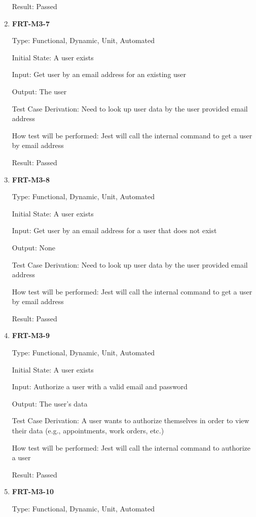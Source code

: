 \documentclass[12pt, titlepage]{article}
\begin{document}
\begin{enumerate}
	      Result: Passed

	\item \textbf{FRT-M3-7}

	      Type: Functional, Dynamic, Unit, Automated

	      Initial State: A user exists

	      Input: Get user by an email address for an existing user

	      Output: The user

	      Test Case Derivation: Need to look up user data by the user provided email address

	      How test will be performed: Jest will call the internal command to get a user by email address

	      Result: Passed

	\item \textbf{FRT-M3-8}

	      Type: Functional, Dynamic, Unit, Automated

	      Initial State: A user exists

	      Input: Get user by an email address for a user that does not exist

	      Output: None

	      Test Case Derivation: Need to look up user data by the user provided email address

	      How test will be performed: Jest will call the internal command to get a user by email address

	      Result: Passed

	\item \textbf{FRT-M3-9}

	      Type: Functional, Dynamic, Unit, Automated

	      Initial State: A user exists

	      Input: Authorize a user with a valid email and password

	      Output: The user's data

	      Test Case Derivation: A user wants to authorize themselves in order to view their data (e.g.,
	      appointments, work orders, etc.)

	      How test will be performed: Jest will call the internal command to authorize a user

	      Result: Passed

	\item \textbf{FRT-M3-10}

	      Type: Functional, Dynamic, Unit, Automated


\end{enumerate}
\end{document}
